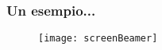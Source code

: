 \begin{frame}
  \frametitle{Un esempio...}
  
  \begin{figure}[h]
   \centering
   \texttt{[image: screenBeamer]}
  \end{figure}

\end{frame}
